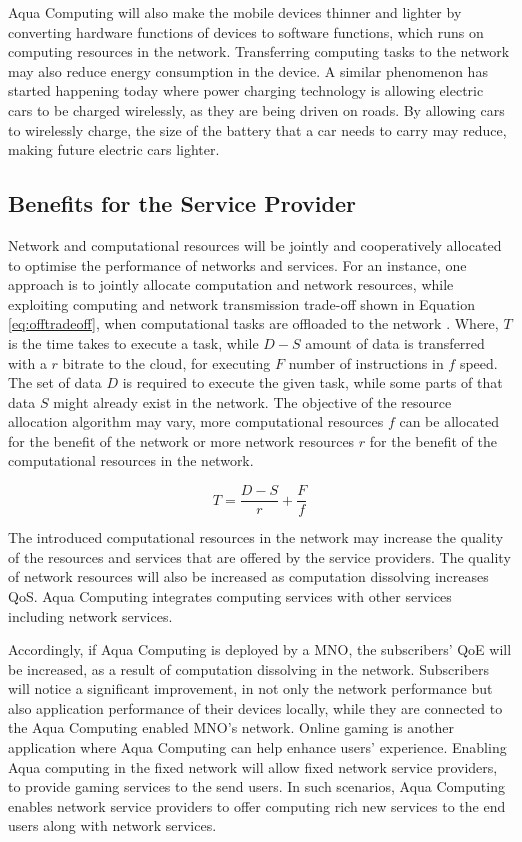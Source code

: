 \documentclass[12pt,journal,compsoc, onecolumn]{IEEEtran}
\begin{document}
Aqua Computing will also make the mobile devices thinner and lighter by converting hardware functions of devices to software functions, which runs on computing resources in the network. Transferring computing tasks to the network may also reduce energy consumption in the device. A similar phenomenon has started happening today where power charging technology is allowing electric cars to be charged wirelessly, as they are being driven on roads. By allowing cars to wirelessly charge, the size of the battery that a car needs to carry may reduce, making future electric cars lighter.

\subsection{Benefits for the Service Provider}

Network and computational resources will be jointly and cooperatively allocated to optimise the performance of networks and services. For an instance, one approach is to jointly allocate computation and network resources, while exploiting computing and network transmission trade-off shown in Equation \ref{eq:offtradeoff}, when computational tasks are offloaded to the network \cite{5445167} . Where, $T$ is the time takes to execute a task, while $D-S$ amount of data is transferred with a $r$ bitrate to the cloud, for executing $F$ number of instructions in $f$ speed. The set of data $D$ is required to execute the given task, while some parts of that data $S$ might already exist in the network. The objective of the resource allocation algorithm may vary, more computational resources $f$ can be allocated for the benefit of the network or more network resources $r$ for the benefit of the computational resources in the network.

\begin{equation}
\label{eq:offtradeoff}
T = \frac{D-S}{r} + \frac{F}{f}
\end{equation}

The introduced computational resources in the network may increase the quality of the resources and services that are offered by the service providers. The quality of network resources will also be increased as computation dissolving increases QoS. Aqua Computing integrates computing services with other services including network services.

Accordingly, if Aqua Computing is deployed by a MNO, the subscribers' QoE will be increased, as a result of computation dissolving in the network. Subscribers will notice a significant improvement, in not only the network performance but also application performance of their devices locally, while they are connected to the Aqua Computing enabled MNO's network. Online gaming is another application where Aqua Computing can help enhance users' experience. Enabling Aqua computing in the fixed network will allow fixed network service providers, to provide gaming services to the send users. In such scenarios, Aqua Computing enables network service providers to offer computing rich new services to the end users along with network services.
\end{document}
